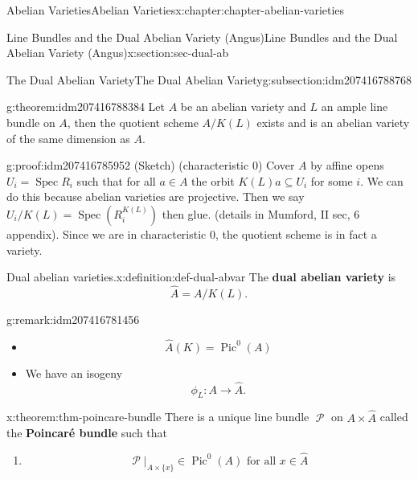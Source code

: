\documentclass[oneside,10pt,]{book}
\newcommand{\terminology}[1]{\textbf{#1}}
\numberwithin{equation}{section}
\newcommand{\sheaf}[1]{\operatorname{\mathcal{#1}}}
\DeclareMathOperator{\Pic}{Pic}
\DeclareMathOperator{\Spec}{Spec}
\begin{document}
\begin{chapterptx}{Abelian Varieties}{}{Abelian Varieties}{}{}{x:chapter:chapter-abelian-varieties}
\begin{sectionptx}{Line Bundles and the Dual Abelian Variety (Angus)}{}{Line Bundles and the Dual Abelian Variety (Angus)}{}{}{x:section:sec-dual-ab}
\typeout{************************************************}
%
\begin{subsectionptx}{The Dual Abelian Variety}{}{The Dual Abelian Variety}{}{}{g:subsection:idm207416788768}
\begin{theorem}{}{}{g:theorem:idm207416788384}%
Let \(A\) be an abelian variety and \(L\) an ample line bundle on \(A\), then the quotient scheme \(A/K(L)\) exists and is an abelian variety of the same dimension as \(A\).%
\end{theorem}
\begin{proofptx}{}{g:proof:idm207416785952}
(Sketch) (characteristic 0) Cover \(A\) by affine opens \(U_i = \Spec R_i\) such that for all \(a \in A\) the orbit \(K(L)a \subseteq U_i\) for some \(i\). We can do this because abelian varieties are projective. Then we say \(U_i / K(L) = \Spec(R^{K(L)}_i)\) then glue. (details in Mumford, II sec, 6  appendix). Since we are in characteristic 0, the quotient scheme is in fact a variety.%
\end{proofptx}
\begin{definition}{Dual abelian varieties.}{x:definition:def-dual-abvar}%
The \terminology{dual abelian variety} is%
\begin{equation*}
\hat A = A/K(L)\text{.}
\end{equation*}
%
\end{definition}
\begin{remark}{}{g:remark:idm207416781456}%
%
\begin{itemize}[label=\textbullet]
\item{}%
\begin{equation*}
\hat A(K) = \Pic^0(A)
\end{equation*}
%
\item{}We have an isogeny%
\begin{equation*}
\phi_L\colon A \to \hat A\text{.}
\end{equation*}
%
\end{itemize}
%
\end{remark}
\begin{theorem}{}{}{x:theorem:thm-poincare-bundle}%
There is a unique line bundle \(\sheaf P\) on \(A\times \hat A\) called the \terminology{Poincaré bundle} such that%
\begin{enumerate}
\item{}%
\begin{equation*}
\sheaf P|_{A\times \{x\}} \in \Pic^0(A) \text{ for all }x\in \hat A
\end{equation*}

\end{enumerate}
\end{theorem}
\end{subsectionptx}
\end{sectionptx}
\end{chapterptx}
\end{document}
